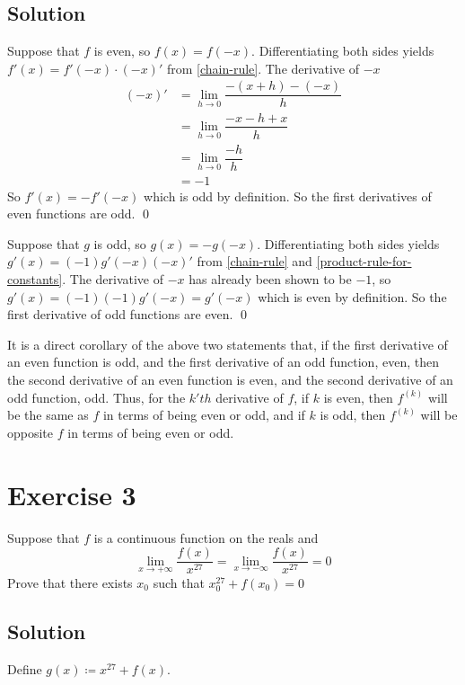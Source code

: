 \documentclass{article}
\begin{document}
\subsection{Solution}

Suppose that $f$ is even, so $f(x)=f(-x)$. Differentiating both sides yields $f'(x)=f'(-x)\cdot(-x)'$ from \cref{chain-rule}. The derivative of $-x$
\begin{align*}
	(-x)' & = \lim_{h \to 0}\dfrac{-(x+h)-(-x)}{h} \\[0.5em]
	      & = \lim_{h \to 0}\dfrac{-x-h+x}{h}      \\[0.5em]
	      & = \lim_{h \to 0}\dfrac{-h}{h}          \\[0.5em]
	      & = -1
\end{align*}
So $f'(x)=-f'(-x)$ which is odd by definition. So the first derivatives of even functions are odd. \qed

Suppose that $g$ is odd, so $g(x)=-g(-x)$. Differentiating both sides yields $g'(x)=(-1)g'(-x)(-x)'$ from \cref{chain-rule} and \cref{product-rule-for-constants}.
The derivative of $-x$ has already been shown to be $-1$, so $g'(x)=(-1)(-1)g'(-x)=g'(-x)$ which is even by definition. So the first derivative of
odd functions are even. \qed

It is a direct corollary of the above two statements that, if the first derivative of an even function is odd, and the first derivative of an odd function, even, then
the second derivative of an even function is even, and the second derivative of an odd function, odd. Thus, for the $k'th$ derivative of $f$, if $k$ is
even, then $f^{(k)}$ will be the same as $f$ in terms of being even or odd, and if $k$ is odd, then $f^{(k)}$ will be opposite $f$ in terms of being
even or odd.

\section{Exercise 3}
Suppose that $f$ is a continuous function on the reals and
\begin{equation*}
	\lim_{x \to +\infty}\dfrac{f(x)}{x^{27}}=\lim_{x \to -\infty}\dfrac{f(x)}{x^{27}}=0
\end{equation*}
Prove that there exists $x_0$ such that $x_0^{27}+f(x_0)=0$

\subsection{Solution}

Define $g(x) \coloneq x^{27}+f(x)$.
\end{document}
